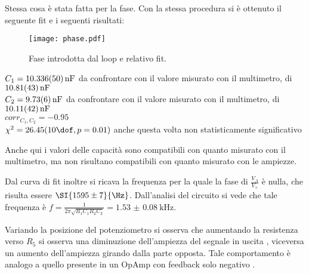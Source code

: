 Stessa cosa è stata fatta per la fase. Con la stessa procedura si è ottenuto il seguente fit e i seguenti risultati:
\begin{figure}[h]
	\centering
	\texttt{[image: phase.pdf]}
	\caption{Fase introdotta dal loop e relativo fit.}
	\label{f:lpgn}
\end{figure}
$C_1=\SI{10.336 \pm 0.05}{nF}$ da confrontare con il valore misurato con il multimetro, di $\SI{10.81\pm 0.43}{nF}$\\
$C_2=\SI{9.73\pm 0.06}{nF}$ da confrontare con il valore misurato con il multimetro, di $\SI{10.11\pm 0.42}{nF}$\\
$corr_{C_1, C_2}=-0.95$\\
$\chi^2=26.45 (10 \dof, p = 0.01)$ anche questa volta non statisticamente significativo


Anche qui i valori delle capacità sono compatibili con quanto misurato con il multimetro, ma non risultano compatibili con quanto misurato con le ampiezze. %
 

Dal curva di fit inoltre si ricava la frequenza per la quale la fase di $\frac{V_A}{V_+}$ è nulla, che risulta essere $\SI{1595 \pm 7}{\Hz}$.%
Dall'analisi del circuito si vede che tale frequenza è $f=\frac{1}{2 \pi \sqrt{R_1C_1R_2C_2}}= \SI{1.53(8)}{\kHz}$. %

Variando la posizione del potenziometro si osserva che aumentando la resistenza verso $R_5$ si osserva una diminuzione dell'ampiezza del segnale in uscita , viceversa un aumento dell'ampiezza girando dalla parte opposta. Tale comportamento è analogo a quello presente in un OpAmp con feedback solo negativo .
